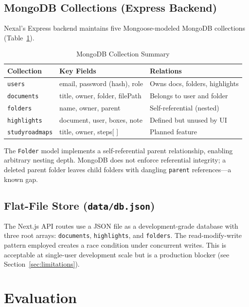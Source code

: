 \documentclass[conference]{IEEEtran}
\begin{document}
\subsection{MongoDB Collections (Express Backend)}

Nexal's Express backend maintains five Mongoose-modeled MongoDB collections (Table~\ref{tab:schema}).

\begin{table}[H]
\centering
\caption{MongoDB Collection Summary}
\label{tab:schema}
\renewcommand{\arraystretch}{1.2}
\begin{tabular}{@{}lll@{}}
\toprule
\textbf{Collection} & \textbf{Key Fields} & \textbf{Relations} \\
\midrule
\texttt{users} & email, password (hash), role & Owns docs, folders, highlights \\
\texttt{documents} & title, owner, folder, filePath & Belongs to user and folder \\
\texttt{folders} & name, owner, parent & Self-referential (nested) \\
\texttt{highlights} & document, user, boxes, note & Defined but unused by UI \\
\texttt{studyroadmaps} & title, owner, steps[ ] & Planned feature \\
\bottomrule
\end{tabular}
\end{table}

The \texttt{Folder} model implements a self-referential parent relationship, enabling arbitrary nesting depth. MongoDB does not enforce referential integrity; a deleted parent folder leaves child folders with dangling \texttt{parent} references---a known gap.

\subsection{Flat-File Store (\texttt{data/db.json})}

The Next.js API routes use a JSON file as a development-grade database with three root arrays: \texttt{documents}, \texttt{highlights}, and \texttt{folders}. The read-modify-write pattern employed creates a race condition under concurrent writes. This is acceptable at single-user development scale but is a production blocker (see Section~\ref{sec:limitations}).

\section{Evaluation}
\label{sec:eval}
\end{document}
